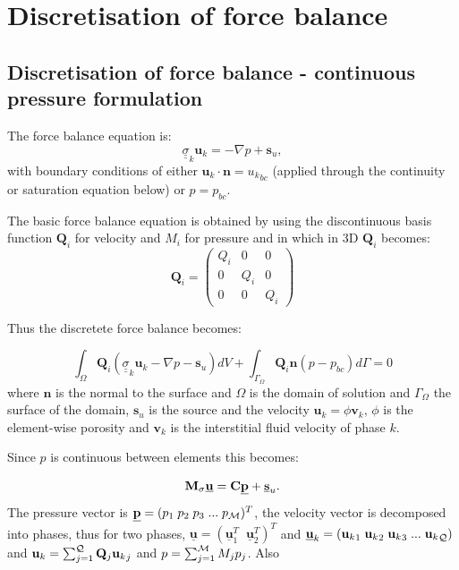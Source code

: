 \section{Discretisation of force balance} 


\subsection{Discretisation of force balance - continuous pressure formulation} 

The force balance equation is:
\begin{equation}
{\underline {\underline \sigma}}_k {\mathbf u}_k = - \nabla p + {\mathbf s}_u, 
\label{force-bal}
\end{equation}
with boundary conditions of either
${{\mathbf u}_k}\cdot {\mathbf n} = {{ u}_k}_{bc}$ (applied through the continuity  
or saturation 
equation below) or $p = p_{bc}$. 

The basic force balance equation is obtained by 
using the discontinuous basis function ${\mathbf Q}_i$ for velocity and 
$M_i$ for pressure and in which in 3D ${\mathbf Q}_i$ becomes:
\begin{equation}
{\mathbf Q}_i = 
  \begin{pmatrix}
    Q_i   & 0 & 0 \\
    0   & Q_i & 0 \\
    0 & 0 & Q_i
  \end{pmatrix}
\label{m_sigma_matrix}
\end{equation}

 Thus the discretete force balance becomes:

\begin{equation}
\int_\Omega {\mathbf Q}_i ({\underline {\underline \sigma}}_k {\mathbf u}_k - \nabla p -{\mathbf s}_u) dV 
+  \int_{\Gamma_{\Omega}} {\mathbf Q}_i {\mathbf n} (p - p_{bc}) d\Gamma =0
\label{force-semi-disc}
\end{equation}
where ${\mathbf n}$ is the normal to the surface 
and $\Omega$ is the domain of solution and 
${\Gamma_{\Omega}}$ the surface of the domain, ${\mathbf s}_u$ is 
the source and the velocity ${\mathbf u}_k = \phi {\mathbf v}_k$, 
$\phi$ is the 
element-wise 
porosity and ${\mathbf v}_k$ is the interstitial fluid velocity of phase $k$. 

Since $p$ is continuous between elements this becomes:

\begin{equation}
{\mathbf M}_\sigma \underline {\mathbf u} = {\mathbf C} \underline {\bf p} 
+ \underline {\bf s}_u. 
\label{force-balance-matrix-form}
\end{equation}
The pressure vector is $\underline{\bf p} =(p_1\; p_2 \; p_3\; ...\; p_{\cal M})^T$, 
the velocity vector is decomposed into phases, thus for two phases, 
$\underline{\mathbf u}=(\underline{\mathbf u}_1^T \;\; \underline{\mathbf u}_2^T)^T$ 
and $\underline{\mathbf u}_k=({{\mathbf u}_k}_1\; {{\mathbf u}_k}_2\; {{\mathbf u}_k}_3\; ...\; {{\mathbf u}_k}_{\cal Q}) $ 
and ${\mathbf u}_k = \sum_{j=1}^{\cal Q} {\mathbf Q}_j{{\mathbf u}_k}_j$ and 
$p=\sum_{j=1}^{\cal M} M_j{p}_j$. Also 


